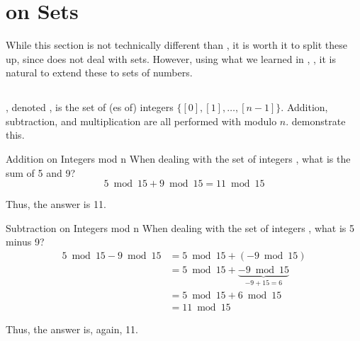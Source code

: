 \section{ on Sets}\label{sec:Number_Theory_on_Sets}
While this section is not technically different than , it is worth it to split these up, since  does not deal with sets.
However, using what we learned in , , it is natural to extend these to sets of numbers.

\subsection{\texorpdfstring{\TextIntsModN{}}{Sets of Integers Modulo n}}\label{subsec:Z_mod_n}
\begin{definition}[\TextIntsModN{}]\label{def:Z_mod_n}
  , denoted \TextIntsModN{}, is the set of (es of) integers $\lbrace [0], [1], \ldots , [n-1] \rbrace$.
  Addition, subtraction, and multiplication are all performed with modulo $n$.
   demonstrate this.
\end{definition}

\begin{example}[]{Addition on Integers mod n}
  When dealing with the set of integers , what is the sum of 5 and 9?
  \tcblower{}
  \begin{equation*}
    5 \bmod 15 + 9 \bmod 15 = 11 \bmod 15
  \end{equation*}

  Thus, the answer is 11.
\end{example}

\begin{example}[]{Subtraction on Integers mod n}
  When dealing with the set of integers , what is 5 minus 9?
  \tcblower{}
  \begin{align*}
    5 \bmod 15 - 9 \bmod 15 &= 5 \bmod 15 + (-9 \bmod 15) \\
                            &= 5 \bmod 15 + \underbrace{-9 \bmod 15}_{-9 + 15 = 6} \\
                            &= 5 \bmod 15 + 6 \bmod 15 \\
                            &= 11 \bmod 15
  \end{align*}

  Thus, the answer is, again, 11.
\end{example}

